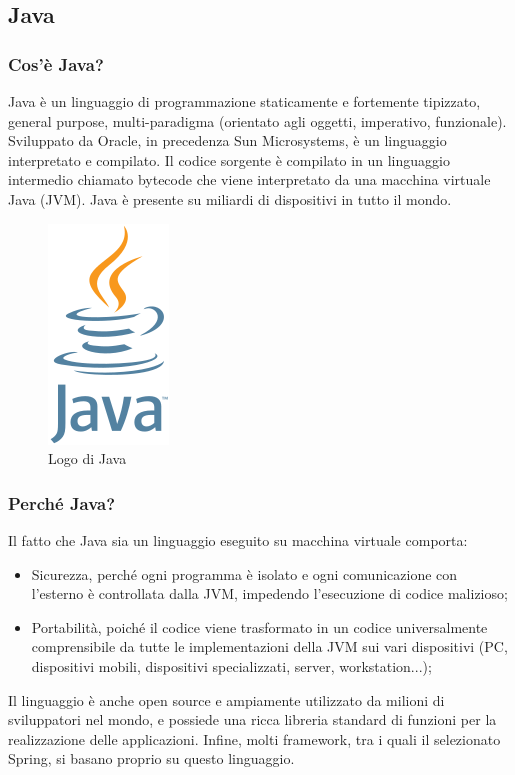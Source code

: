         \subsection{Java}
            \subsubsection{Cos'è Java?}
                Java è un linguaggio di programmazione staticamente e fortemente tipizzato, general purpose, multi-paradigma (orientato agli oggetti, imperativo, funzionale). Sviluppato da Oracle, in precedenza Sun Microsystems, è un linguaggio interpretato e compilato. Il codice sorgente è compilato in un linguaggio intermedio chiamato bytecode che viene interpretato da una macchina virtuale Java (JVM).  Java è presente su miliardi di dispositivi in tutto il mondo.
            \begin{figure}[htbp!]
                \centering
                \includegraphics[width=0.15\linewidth]{Immagini/System Design/Java.png}
                \caption{Logo di Java}
            \end{figure}
            \subsubsection{Perché Java?}
                Il fatto che Java sia un linguaggio eseguito su macchina virtuale comporta:
                \begin{itemize}
                    \item Sicurezza, perché ogni programma è isolato e ogni comunicazione con l'esterno è controllata dalla JVM, impedendo l'esecuzione di codice malizioso;
                    \item Portabilità, poiché il codice viene trasformato in un codice universalmente comprensibile da tutte le implementazioni della JVM sui vari dispositivi (PC, dispositivi mobili, dispositivi specializzati, server, workstation...);
                \end{itemize}
                Il linguaggio è anche open source e ampiamente utilizzato da milioni di sviluppatori nel mondo, e possiede una ricca libreria standard di funzioni per la realizzazione delle applicazioni. Infine, molti framework, tra i quali il selezionato Spring, si basano proprio su questo linguaggio.
                
